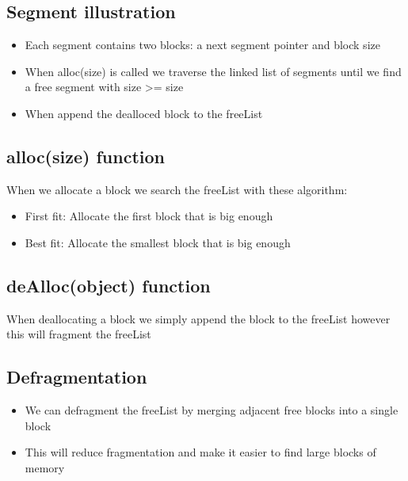 \documentclass[12pt,a4paper]{article}
\begin{document}
\subsection{Segment illustration}
\begin{itemize}
    \item Each segment contains two blocks: a next segment pointer and block size 
    \item When alloc(size) is called we traverse the linked list of segments until we find a free segment with size >= size
    \item When append the dealloced block to the freeList
\end{itemize}

\subsection{alloc(size) function}
When we allocate a block we search the freeList with these algorithm:
\begin{itemize}
    \item First fit: Allocate the first block that is big enough
    \item Best fit: Allocate the smallest block that is big enough
\end{itemize}

\subsection{deAlloc(object) function}
When deallocating a block we simply append the block to the freeList however this will fragment the freeList

\subsection{Defragmentation}
\begin{itemize}
    \item We can defragment the freeList by merging adjacent free blocks into a single block
    \item This will reduce fragmentation and make it easier to find large blocks of memory
\end{itemize}
\end{document}
